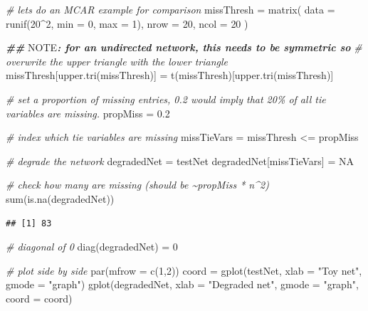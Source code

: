 \documentclass[
]{article}
\newenvironment{Shaded}{\begin{snugshade}}{\end{snugshade}}
\newcommand{\AlertTok}[1]{\textcolor[rgb]{0.94,0.16,0.16}{#1}}
\newcommand{\AttributeTok}[1]{\textcolor[rgb]{0.77,0.63,0.00}{#1}}
\newcommand{\CommentTok}[1]{\textcolor[rgb]{0.56,0.35,0.01}{\textit{#1}}}
\newcommand{\ConstantTok}[1]{\textcolor[rgb]{0.00,0.00,0.00}{#1}}
\newcommand{\DecValTok}[1]{\textcolor[rgb]{0.00,0.00,0.81}{#1}}
\newcommand{\DocumentationTok}[1]{\textcolor[rgb]{0.56,0.35,0.01}{\textbf{\textit{#1}}}}
\newcommand{\FloatTok}[1]{\textcolor[rgb]{0.00,0.00,0.81}{#1}}
\newcommand{\FunctionTok}[1]{\textcolor[rgb]{0.00,0.00,0.00}{#1}}
\newcommand{\NormalTok}[1]{#1}
\newcommand{\OtherTok}[1]{\textcolor[rgb]{0.56,0.35,0.01}{#1}}
\newcommand{\SpecialCharTok}[1]{\textcolor[rgb]{0.00,0.00,0.00}{#1}}
\newcommand{\StringTok}[1]{\textcolor[rgb]{0.31,0.60,0.02}{#1}}
\begin{document}
\begin{Shaded}
\begin{Highlighting}[]
\CommentTok{\# let\textquotesingle{}s do an MCAR example for comparison}
\NormalTok{missThresh }\OtherTok{=} \FunctionTok{matrix}\NormalTok{( }\AttributeTok{data =} \FunctionTok{runif}\NormalTok{(}\DecValTok{20}\SpecialCharTok{\^{}}\DecValTok{2}\NormalTok{, }\AttributeTok{min =} \DecValTok{0}\NormalTok{, }\AttributeTok{max =} \DecValTok{1}\NormalTok{),}
                     \AttributeTok{nrow =} \DecValTok{20}\NormalTok{,}
                     \AttributeTok{ncol =} \DecValTok{20}\NormalTok{ )}

\DocumentationTok{\#\# }\AlertTok{NOTE}\DocumentationTok{: for an undirected network, this needs to be symmetric so}
\CommentTok{\# overwrite the upper triangle with the lower triangle}
\NormalTok{missThresh[}\FunctionTok{upper.tri}\NormalTok{(missThresh)] }\OtherTok{=} \FunctionTok{t}\NormalTok{(missThresh)[}\FunctionTok{upper.tri}\NormalTok{(missThresh)]}

\CommentTok{\# set a proportion of missing entries, 0.2 would imply that 20\% of all tie variables are missing.}
\NormalTok{propMiss }\OtherTok{=} \FloatTok{0.2}

\CommentTok{\# index which tie variables are missing}
\NormalTok{missTieVars }\OtherTok{=}\NormalTok{ missThresh }\SpecialCharTok{\textless{}=}\NormalTok{ propMiss}

\CommentTok{\# degrade the network}
\NormalTok{degradedNet }\OtherTok{=}\NormalTok{ testNet}
\NormalTok{degradedNet[missTieVars] }\OtherTok{=} \ConstantTok{NA}

\CommentTok{\# check how many are missing (should be \textasciitilde{}propMiss * n\^{}2)}
\FunctionTok{sum}\NormalTok{(}\FunctionTok{is.na}\NormalTok{(degradedNet))}
\end{Highlighting}
\end{Shaded}

\begin{verbatim}
## [1] 83
\end{verbatim}

\begin{Shaded}
\begin{Highlighting}[]
\CommentTok{\# diagonal of 0}
\FunctionTok{diag}\NormalTok{(degradedNet) }\OtherTok{=} \DecValTok{0}

\CommentTok{\# plot side by side}
\FunctionTok{par}\NormalTok{(}\AttributeTok{mfrow =} \FunctionTok{c}\NormalTok{(}\DecValTok{1}\NormalTok{,}\DecValTok{2}\NormalTok{))}
\NormalTok{coord }\OtherTok{=} \FunctionTok{gplot}\NormalTok{(testNet, }\AttributeTok{xlab =} \StringTok{"Toy net"}\NormalTok{, }\AttributeTok{gmode =} \StringTok{"graph"}\NormalTok{)}
\FunctionTok{gplot}\NormalTok{(degradedNet, }\AttributeTok{xlab =} \StringTok{"Degraded net"}\NormalTok{, }\AttributeTok{gmode =} \StringTok{"graph"}\NormalTok{, }\AttributeTok{coord =}\NormalTok{ coord)}
\end{Highlighting}
\end{Shaded}
\end{document}
